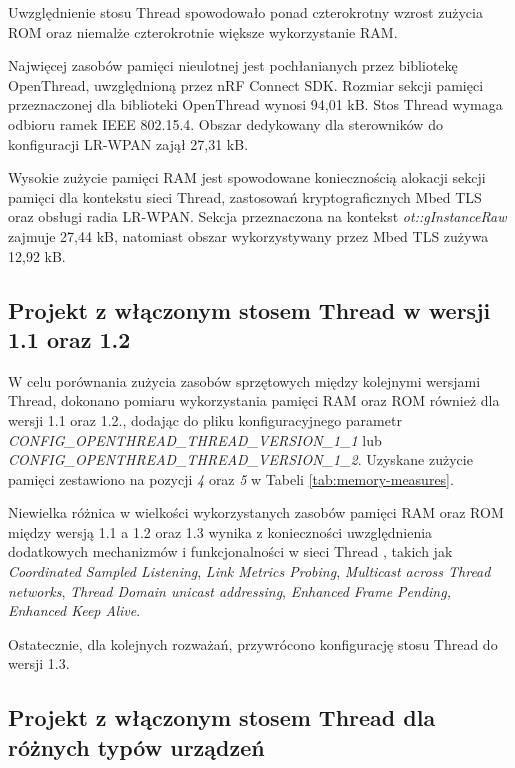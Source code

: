         Uwzględnienie stosu Thread spowodowało ponad czterokrotny wzrost zużycia ROM oraz niemalże czterokrotnie większe wykorzystanie RAM. 
        
        Najwięcej zasobów pamięci nieulotnej jest pochłanianych przez bibliotekę OpenThread, uwzględnioną przez nRF Connect SDK. Rozmiar sekcji pamięci przeznaczonej dla biblioteki OpenThread wynosi 94,01 kB. Stos Thread wymaga odbioru ramek IEEE 802.15.4. Obszar dedykowany dla sterowników do konfiguracji LR-WPAN zajął 27,31 kB.

        Wysokie zużycie pamięci RAM jest spowodowane koniecznością alokacji sekcji pamięci dla kontekstu sieci Thread, zastosowań kryptograficznych Mbed TLS oraz obsługi radia LR-WPAN. Sekcja przeznaczona na kontekst \textit{ot::gInstanceRaw} zajmuje 27,44 kB, natomiast obszar wykorzystywany przez Mbed TLS zużywa 12,92 kB.

    \subsection{Projekt z włączonym stosem Thread w wersji 1.1 oraz 1.2}

    W celu porównania zużycia zasobów sprzętowych między kolejnymi wersjami Thread, dokonano pomiaru wykorzystania pamięci RAM oraz ROM również dla wersji 1.1 oraz 1.2., dodając do pliku konfiguracyjnego parametr \textit{CONFIG\_OPENTHREAD\_THREAD\_VERSION\_1\_1} lub \\ \textit{CONFIG\_OPENTHREAD\_THREAD\_VERSION\_1\_2}. Uzyskane zużycie pamięci zestawiono na pozycji \textit{4} oraz \textit{5} w Tabeli \ref{tab:memory-measures}.

    Niewielka różnica w wielkości wykorzystanych zasobów pamięci RAM oraz ROM między wersją 1.1 a 1.2 oraz 1.3 wynika z konieczności uwzględnienia dodatkowych mechanizmów i funkcjonalności w sieci Thread \cite{nrf-thread-version-options}, takich jak \textit{Coordinated Sampled Listening}, \textit{Link Metrics Probing}, \textit{Multicast across Thread networks}, \textit{Thread Domain unicast addressing}, \textit{Enhanced Frame Pending, Enhanced Keep Alive}.

    Ostatecznie, dla kolejnych rozważań, przywrócono konfigurację stosu Thread do wersji 1.3.

    \subsection{Projekt z włączonym stosem Thread dla różnych typów urządzeń}

